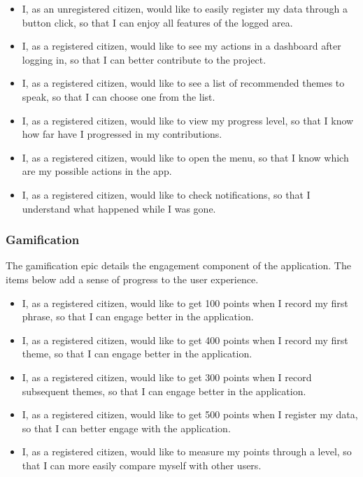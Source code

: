\begin{itemize}
    \item I, as an unregistered citizen, would like to easily register my data through a button click, so that I can enjoy all features of the logged area.
    \item I, as a registered citizen, would like to see my actions in a dashboard after logging in, so that I can better contribute to the project.
    \item I, as a registered citizen, would like to see a list of recommended themes to speak, so that I can choose one from the list.
    \item I, as a registered citizen, would like to view my progress level, so that I know how far have I progressed in my contributions.
    \item I, as a registered citizen, would like to open the menu, so that I know which are my possible actions in the app.
    \item I, as a registered citizen, would like to check notifications, so that I understand what happened while I was gone.
\end{itemize}

\subsubsection{Gamification}

The gamification epic details the engagement component of the application. The items below add a sense of progress to the user experience.

\begin{itemize}
    \item I, as a registered citizen, would like to get 100 points when I record my first phrase, so that I can engage better in the application.
    \item I, as a registered citizen, would like to get 400 points when I record my first theme, so that I can engage better in the application.
    \item I, as a registered citizen, would like to get 300 points when I record subsequent themes, so that I can engage better in the application.
    \item I, as a registered citizen, would like to get 500 points when I register my data, so that I can better engage with the application.
    \item I, as a registered citizen, would like to measure my points through a level, so that I can more easily compare myself with other users.
\end{itemize}

